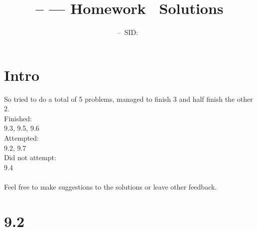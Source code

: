 \documentclass[11pt]{article}
\title{\Class-- \Session--- Homework \Homework\ Solutions}
\author{\Name--\ SID:\ \SID}
\date{}
\begin{document}
\maketitle

\section*{Intro}

So tried to do a total of 5 problems, managed to finish 3 and half finish the other 2.\\
Finished:\\
9.3, 9.5, 9.6\\
Attempted:\\
9.2, 9.7\\
Did not attempt:\\
9.4\\
\\
Feel free to make suggestions to the solutions or leave other feedback.

\newpage

\section*{9.2}
\end{document}
